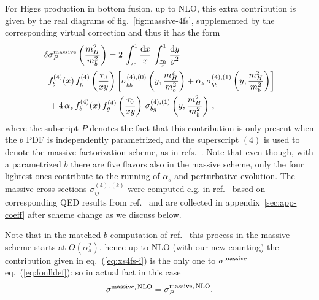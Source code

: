 For Higgs production in bottom fusion, up to NLO, this extra
contribution is given by
the real diagrams of fig.~\ref{fig:massive-4fs}, supplemented
by the corresponding virtual correction and thus it
has the form
\begin{equation}
  \label{eq:xs4fs-i}
  \begin{split}
    \delta&\sigma_P^{\rm massive}\left(\frac{m_H^2}{m_b^2}\right) = 
    2\,\int_{\tau_0}^1 \frac{{\rm d}{x}}{x}\,
    \int_{\frac{\tau_0}{x}}^1 \frac{{\rm d}{y}}{y^2}\, \\
    &f^{(4)}_b(x)\,f^{(4)}_{\bar{b}}\left(\frac{\tau_0}{xy}\right)
    \biggl[\sigma_{b\bar{b}}^{(4),(0)}\left(y,\frac{m_H^2}{m_b^2}\right) +
      \alpha_s\,\sigma_{b\bar{b}}^{(4),(1)}\left(y,\frac{m_H^2}{m_b^2}\right)
    \biggr]\\
    &
    +
    4\,\alpha_s\,f^{(4)}_b(x)\,f^{(4)}_g\left(\frac{\tau_0}{xy}\right)\,
    \sigma_{bg}^{(4),(1)}\left(y,\frac{m_H^2}{m_b^2}\right)\,,
  \end{split}
\end{equation}
where the subscript $P$ denotes the fact that this contribution is
only present when the $b$ PDF is independently parametrized, and the
superscript $(4)$ is used to denote the massive factorization scheme,
as in refs.~\cite{Forte:2015hba,Forte:2016sja}. Note that even though,
with a parametrized $b$ there are five flavors also in
the massive scheme, only the four lightest ones contribute to
the running of $\alpha_s$ and perturbative evolution. The
massive cross-sections $\sigma_{ij}^{(4),(k)}$ were computed e.g. in
ref.~\cite{Krauss:2017wmx} based on corresponding QED results from
ref.~\cite{Dittmaier:1999mb} and are collected in
appendix~\ref{sec:app-coeff} after scheme change as we discuss below.

Note that in the matched-$b$ computation
of ref.~\cite{Forte:2015hba,Forte:2016sja} this
process  in the massive scheme starts at $O(\alpha_s^2)$, hence up to NLO (with our new
counting) the contribution given in eq.~(\ref{eq:xs4fs-i}) is the only
one to $\sigma^{\rm massive}$ eq.~(\ref{eq:fonlldef}): so in actual fact
in this case
\begin{equation}
   \sigma^{\rm massive,\,NLO}= \sigma^{\rm massive,\,NLO}_{P}.
\end{equation}

